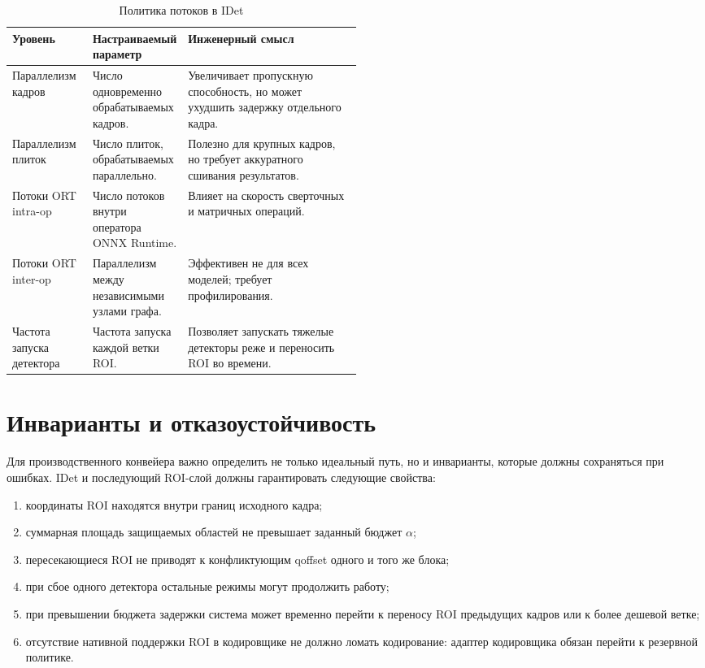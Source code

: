 \documentclass[12pt,a4paper,oneside,openany]{report}
\begin{document}
\begin{table}[H]\centering\caption{Политика потоков в IDet}\label{tab:threading_policy}\small\begin{tabularx}{\linewidth}{@{}P{0.23\linewidth}P{0.27\linewidth}Y@{}}\toprule
Уровень & Настраиваемый параметр & Инженерный смысл \\
\midrule
Параллелизм кадров & Число одновременно обрабатываемых кадров. & Увеличивает пропускную способность, но может ухудшить задержку отдельного кадра. \\
Параллелизм плиток & Число плиток, обрабатываемых параллельно. & Полезно для крупных кадров, но требует аккуратного сшивания результатов. \\
Потоки ORT intra-op & Число потоков внутри оператора ONNX Runtime. & Влияет на скорость сверточных и матричных операций. \\
Потоки ORT inter-op & Параллелизм между независимыми узлами графа. & Эффективен не для всех моделей; требует профилирования. \\
Частота запуска детектора & Частота запуска каждой ветки ROI. & Позволяет запускать тяжелые детекторы реже и переносить ROI во времени. \\
\bottomrule\end{tabularx}
\end{table}

\section{Инварианты и отказоустойчивость}

Для производственного конвейера важно определить не только идеальный путь, но и инварианты, которые должны сохраняться при ошибках. IDet и последующий ROI-слой должны гарантировать следующие свойства:
\begin{enumerate}[label=\arabic*)]
\item координаты ROI находятся внутри границ исходного кадра;
\item суммарная площадь защищаемых областей не превышает заданный бюджет $\alpha$;
\item пересекающиеся ROI не приводят к конфликтующим qoffset одного и того же блока;
\item при сбое одного детектора остальные режимы могут продолжить работу;
\item при превышении бюджета задержки система может временно перейти к переносу ROI предыдущих кадров или к более дешевой ветке;
\item отсутствие нативной поддержки ROI в кодировщике не должно ломать кодирование: адаптер кодировщика обязан перейти к резервной политике.
\end{enumerate}
\end{document}
